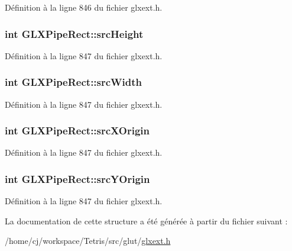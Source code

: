 Définition à la ligne 846 du fichier glxext.\-h.

\hypertarget{struct_g_l_x_pipe_rect_a35632524bce6bffa05f284a9b1c1b8ff}{
\subsubsection[{src\-Height}]{\setlength{\rightskip}{0pt plus 5cm}int G\-L\-X\-Pipe\-Rect\-::src\-Height}}\label{struct_g_l_x_pipe_rect_a35632524bce6bffa05f284a9b1c1b8ff}


Définition à la ligne 847 du fichier glxext.\-h.

\hypertarget{struct_g_l_x_pipe_rect_a2c6c180a4dabb71076366e06a1c7d0ef}{
\subsubsection[{src\-Width}]{\setlength{\rightskip}{0pt plus 5cm}int G\-L\-X\-Pipe\-Rect\-::src\-Width}}\label{struct_g_l_x_pipe_rect_a2c6c180a4dabb71076366e06a1c7d0ef}


Définition à la ligne 847 du fichier glxext.\-h.

\hypertarget{struct_g_l_x_pipe_rect_a9df2313c01f75d149e64f2ff467bc266}{
\subsubsection[{src\-X\-Origin}]{\setlength{\rightskip}{0pt plus 5cm}int G\-L\-X\-Pipe\-Rect\-::src\-X\-Origin}}\label{struct_g_l_x_pipe_rect_a9df2313c01f75d149e64f2ff467bc266}


Définition à la ligne 847 du fichier glxext.\-h.

\hypertarget{struct_g_l_x_pipe_rect_a1f7316dff7050ab2ce9d3d37f8c5450e}{
\subsubsection[{src\-Y\-Origin}]{\setlength{\rightskip}{0pt plus 5cm}int G\-L\-X\-Pipe\-Rect\-::src\-Y\-Origin}}\label{struct_g_l_x_pipe_rect_a1f7316dff7050ab2ce9d3d37f8c5450e}


Définition à la ligne 847 du fichier glxext.\-h.



La documentation de cette structure a été générée à partir du fichier suivant \-:\begin{DoxyCompactItemize}
\item 
/home/cj/workspace/\-Tetris/src/glut/\hyperlink{glxext_8h}{glxext.\-h}\end{DoxyCompactItemize}
